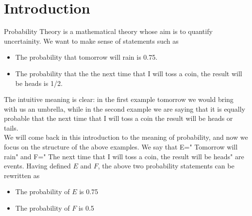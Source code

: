 \documentclass[12pt]{article}
\newcommand{\<}{{\langle \!\! \langle}}
\renewcommand{\>}{{\rangle \!\! \rangle}}
\begin{document}


\section{Introduction}

Probability Theory is a mathematical theory whose aim is to quantify uncertainity. We want to make sense of statements such as  
\begin{itemize}
	\item  The probability that tomorrow will rain is 0.75.
	\item  The probability that the the next time that I will toss a coin, the result will be heads is 1/2. 
\end{itemize}

The intuitive meaning is clear: in the first example tomorrow we would bring with us an umbrella, while in the second example we are saying that it is equally probable that the next time that I will toss a coin the result will be heads or tails. \\
We will come back in this introduction to the meaning of probability, and now we focus on the structure of the above examples. We say that  E=" Tomorrow will rain" and F=" The next time that I will toss a coin, the result will be heads" are events. Having defined $E$ and $F$, the above two probability statements can be rewritten as 

\begin{itemize}

	\item The probability of $E$ is 0.75
	\item The probability of $F$ is 0.5

\end{itemize}
\end{document}
